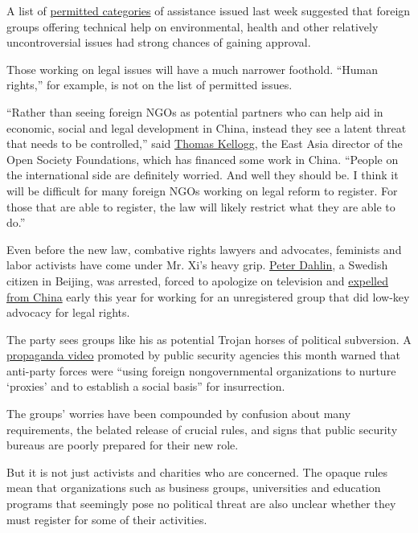 A list of
\href{http://www.mps.gov.cn/n2254314/n2254409/n4904353/c5579013/content.html?from=timeline\&isappinstalled=0}{permitted
categories} of assistance issued last week suggested that foreign groups
offering technical help on environmental, health and other relatively
uncontroversial issues had strong chances of gaining approval.

Those working on legal issues will have a much narrower foothold.
``Human rights,'' for example, is not on the list of permitted issues.

``Rather than seeing foreign NGOs as potential partners who can help aid
in economic, social and legal development in China, instead they see a
latent threat that needs to be controlled,'' said
\href{https://www.opensocietyfoundations.org/people/thomas-kellogg}{Thomas
Kellogg}, the East Asia director of the Open Society Foundations, which
has financed some work in China. ``People on the international side are
definitely worried. And well they should be. I think it will be
difficult for many foreign NGOs working on legal reform to register. For
those that are able to register, the law will likely restrict what they
are able to do.''

Even before the new law, combative rights lawyers and advocates,
feminists and labor activists have come under Mr. Xi's heavy grip.
\href{http://www.nytimes3xbfgragh.onion/2016/07/10/world/asia/china-ned-ngo-peter-dahlin.html}{Peter
Dahlin}, a Swedish citizen in Beijing, was arrested, forced to apologize
on television and
\href{http://www.nytimes3xbfgragh.onion/2016/01/26/world/asia/china-to-expel-swedish-human-rights-advocate.html}{expelled
from China} early this year for working for an unregistered group that
did low-key advocacy for legal rights.

The party sees groups like his as potential Trojan horses of political
subversion. A
\href{http://www.nytimes3xbfgragh.onion/2016/12/22/world/asia/china-video-communist-party.html}{propaganda
video} promoted by public security agencies this month warned that
anti-party forces were ``using foreign nongovernmental organizations to
nurture `proxies' and to establish a social basis'' for insurrection.

The groups' worries have been compounded by confusion about many
requirements, the belated release of crucial rules, and signs that
public security bureaus are poorly prepared for their new role.

But it is not just activists and charities who are concerned. The opaque
rules mean that organizations such as business groups, universities and
education programs that seemingly pose no political threat are also
unclear whether they must register for some of their activities.

